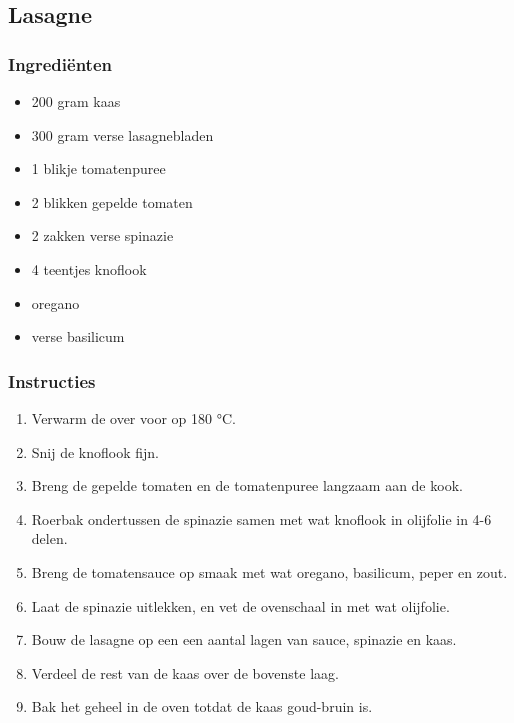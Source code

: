 \subsection{Lasagne}
\subsubsection*{Ingrediënten}
\begin{multicols}{2}
    \begin{itemize}
        \item 200 gram kaas
        \item 300 gram verse lasagnebladen
        \item 1 blikje tomatenpuree
        \item 2 blikken gepelde tomaten
        \item 2 zakken verse spinazie
        \item 4 teentjes knoflook
        \item oregano
        \item verse basilicum
    \end{itemize}
\end{multicols}

\subsubsection*{Instructies}
\begin{multicols}{2}
    \begin{enumerate}
        \item Verwarm de over voor op 180 °C.
        \item Snij de knoflook fijn.
        \item Breng de gepelde tomaten en de tomatenpuree langzaam aan de kook.
        \item Roerbak ondertussen de spinazie samen met wat knoflook in olijfolie in 4-6 delen.
        \item Breng de tomatensauce op smaak met wat oregano, basilicum, peper en zout.
        \item Laat de spinazie uitlekken, en vet de ovenschaal in met wat olijfolie.
        \item Bouw de lasagne op een een aantal lagen van sauce, spinazie en kaas.
        \item Verdeel de rest van de kaas over de bovenste laag.
        \item Bak het geheel in de oven totdat de kaas goud-bruin is.
    \end{enumerate}
\end{multicols}